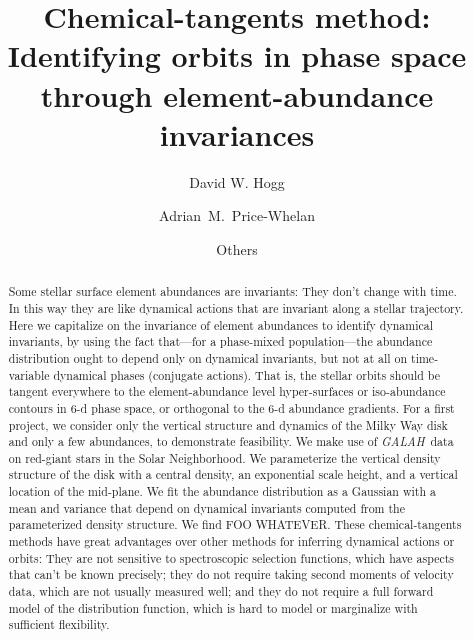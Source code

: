 \documentclass[modern]{aastex62}
\newcommand{\acronym}[1]{{\small{#1}}}
\newcommand{\project}[1]{\textsl{#1}}
\newcommand{\galah}{\project{\acronym{GALAH}}}
\begin{document}
\sloppy\sloppypar\raggedbottom\frenchspacing %
\graphicspath{ {figures/} }

\title{\textbf{%
Chemical-tangents method:\\
Identifying orbits in phase space through element-abundance invariances}}

\author[0000-0003-2866-9403]{David W. Hogg}

\author[0000-0003-0872-7098]{Adrian~M.~Price-Whelan}

\author{Others}

\begin{abstract}\noindent
Some stellar surface element abundances are invariants: They don't change with time.
In this way they are like dynamical actions that are invariant along a stellar trajectory.
Here we capitalize on the invariance of element abundances to identify dynamical
invariants, by using the fact that---for a phase-mixed population---the abundance
distribution ought to depend only on dynamical invariants, but not at all on time-variable
dynamical phases (conjugate actions).
That is, the stellar orbits should be tangent everywhere to the
element-abundance level hyper-surfaces or iso-abundance contours in 6-d phase
space, or orthogonal to the 6-d abundance gradients.
For a first project, we consider only the vertical structure and dynamics of the Milky Way
disk and only a few abundances, to demonstrate feasibility.
We make use of \galah\ data on red-giant stars in the Solar Neighborhood.
We parameterize the vertical density structure of the disk with a central density, an
exponential scale height, and a vertical location of the mid-plane.
We fit the abundance distribution as a Gaussian with a mean and variance that depend
on dynamical invariants computed from the parameterized density structure.
We find FOO WHATEVER.
These chemical-tangents methods have great advantages over other methods
for inferring dynamical actions or orbits: They are not sensitive to spectroscopic
selection functions, which have aspects that can't be known precisely; they
do not require taking second moments of velocity data, which are not usually measured
well; and they do not require a full forward model of the distribution function,
which is hard to model or marginalize with sufficient flexibility.
\end{abstract}
\end{document}
